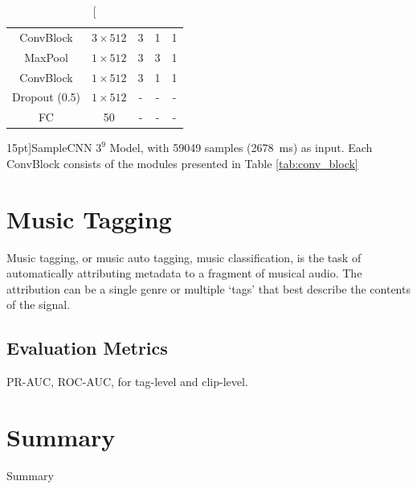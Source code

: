 \begin{table}[t]
\begin{tabular}{ccccc}
        ConvBlock & $3 \times 512$ & 3 & 1 & 1 \\
        MaxPool & $1 \times 512$ & 3 & 3 & 1 \\\hline
        ConvBlock & $1 \times 512$ & 3 & 1 & 1 \\
        Dropout (0.5) & $1 \times 512$ & - & - & - \\\hline
        FC & 50 & - & - & - \\
        \bottomrule
    \end{tabular}
    \caption[][15pt]{SampleCNN $3^9$ Model, with 59049 samples (2678~ms) as input.
Each ConvBlock consists of the modules presented in Table \ref{tab:conv_block}}
    \label{tab:samplecnn_model}
\end{table}


\section{Music Tagging}
Music tagging, or music auto tagging, music classification, is the task of automatically attributing metadata to a fragment of musical audio. The attribution can be a single genre or multiple `tags' that best describe the contents of the signal. 

\subsection{Evaluation Metrics}
PR-AUC, ROC-AUC, for tag-level and clip-level.

\section*{Summary}
Summary